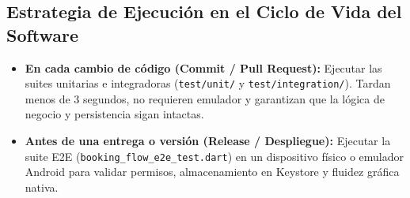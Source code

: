 \documentclass[11pt,a4paper]{article}
\begin{document}
\subsection{Estrategia de Ejecución en el Ciclo de Vida del Software}
\begin{itemize}
    \item \textbf{En cada cambio de código (Commit / Pull Request):} Ejecutar las suites unitarias e integradoras (\texttt{test/unit/} y \texttt{test/integration/}). Tardan menos de 3 segundos, no requieren emulador y garantizan que la lógica de negocio y persistencia sigan intactas.
    \item \textbf{Antes de una entrega o versión (Release / Despliegue):} Ejecutar la suite E2E (\texttt{booking\_flow\_e2e\_test.dart}) en un dispositivo físico o emulador Android para validar permisos, almacenamiento en Keystore y fluidez gráfica nativa.
\end{itemize}
\end{document}
